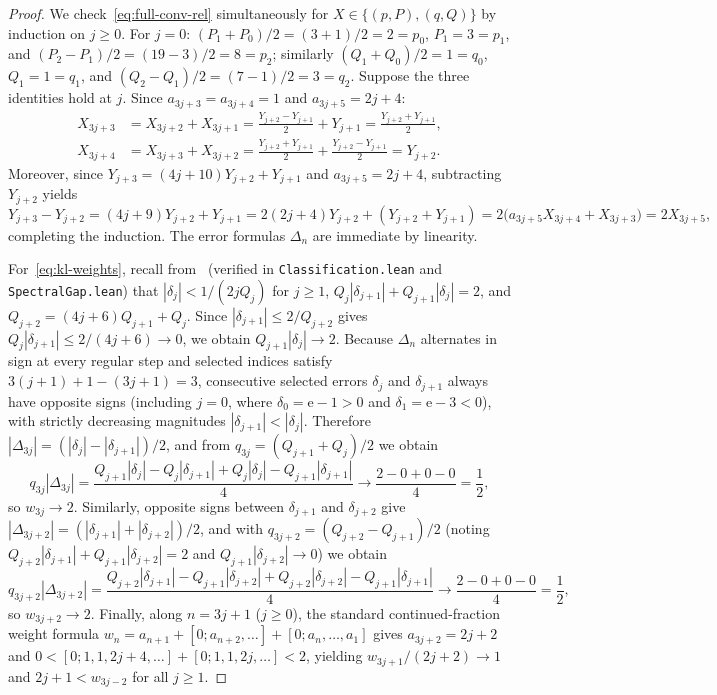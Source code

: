 \documentclass[11pt]{article}
\theoremstyle{definition}
\theoremstyle{remark}
\newcommand{\ee}{\mathrm{e}}
\begin{document}
\begin{proof}
We check~\eqref{eq:full-conv-rel} simultaneously for $X\in\{(p,P),(q,Q)\}$ by
induction on $j\ge0$. For $j=0$: $(P_1+P_0)/2=(3+1)/2=2=p_0$, $P_1=3=p_1$, and
$(P_2-P_1)/2=(19-3)/2=8=p_2$; similarly $(Q_1+Q_0)/2=1=q_0$, $Q_1=1=q_1$, and
$(Q_2-Q_1)/2=(7-1)/2=3=q_2$.
Suppose the three identities hold at $j$. Since $a_{3j+3}=a_{3j+4}=1$ and
$a_{3j+5}=2j+4$:
\begin{align*}
X_{3j+3}&=X_{3j+2}+X_{3j+1}=\frac{Y_{j+2}-Y_{j+1}}{2}+Y_{j+1}=\frac{Y_{j+2}+Y_{j+1}}{2},\\
X_{3j+4}&=X_{3j+3}+X_{3j+2}=\frac{Y_{j+2}+Y_{j+1}}{2}+\frac{Y_{j+2}-Y_{j+1}}{2}=Y_{j+2}.
\end{align*}
Moreover, since $Y_{j+3}=(4j+10)Y_{j+2}+Y_{j+1}$ and $a_{3j+5}=2j+4$, subtracting
$Y_{j+2}$ yields
\[
Y_{j+3}-Y_{j+2}=(4j+9)Y_{j+2}+Y_{j+1}=2(2j+4)Y_{j+2}+(Y_{j+2}+Y_{j+1})=2\bigl(a_{3j+5}X_{3j+4}+X_{3j+3}\bigr)=2X_{3j+5},
\]
completing the induction. The error formulas $\Delta_n$ are immediate by linearity.

For~\eqref{eq:kl-weights}, recall from~\cite{Phase1} (verified in
\texttt{Classification.lean} and \texttt{SpectralGap.lean}) that
$|\delta_j|<1/(2jQ_j)$ for $j\ge1$, $Q_j|\delta_{j+1}|+Q_{j+1}|\delta_j|=2$,
and $Q_{j+2}=(4j+6)Q_{j+1}+Q_j$. Since $|\delta_{j+1}|\le 2/Q_{j+2}$ gives
$Q_j|\delta_{j+1}|\le 2/(4j+6)\to0$, we obtain $Q_{j+1}|\delta_j|\to2$.
Because $\Delta_n$ alternates in sign at every regular step and selected
indices satisfy $3(j+1)+1-(3j+1)=3$, consecutive selected errors $\delta_j$ and
$\delta_{j+1}$ always have opposite signs (including $j=0$, where $\delta_0=\ee-1>0$
and $\delta_1=\ee-3<0$), with strictly decreasing magnitudes $|\delta_{j+1}|<|\delta_j|$.
Therefore $|\Delta_{3j}|=(|\delta_j|-|\delta_{j+1}|)/2$, and from $q_{3j}=(Q_{j+1}+Q_j)/2$
we obtain
\[
q_{3j}|\Delta_{3j}|=\frac{Q_{j+1}|\delta_j|-Q_j|\delta_{j+1}|+Q_j|\delta_j|-Q_{j+1}|\delta_{j+1}|}{4}
\longrightarrow\frac{2-0+0-0}{4}=\frac12,
\]
so $w_{3j}\to2$. Similarly, opposite signs between $\delta_{j+1}$ and $\delta_{j+2}$
give $|\Delta_{3j+2}|=(|\delta_{j+1}|+|\delta_{j+2}|)/2$, and with $q_{3j+2}=(Q_{j+2}-Q_{j+1})/2$
(noting $Q_{j+2}|\delta_{j+1}|+Q_{j+1}|\delta_{j+2}|=2$ and $Q_{j+1}|\delta_{j+2}|\to0$)
we obtain
\[
q_{3j+2}|\Delta_{3j+2}|=\frac{Q_{j+2}|\delta_{j+1}|-Q_{j+1}|\delta_{j+2}|+Q_{j+2}|\delta_{j+2}|-Q_{j+1}|\delta_{j+1}|}{4}
\longrightarrow\frac{2-0+0-0}{4}=\frac12,
\]
so $w_{3j+2}\to2$. Finally, along $n=3j+1$ ($j\ge0$), the standard continued-fraction
weight formula $w_n=a_{n+1}+[0;a_{n+2},\dots]+[0;a_n,\dots,a_1]$ gives $a_{3j+2}=2j+2$
and $0<[0;1,1,2j+4,\dots]+[0;1,1,2j,\dots]<2$, yielding $w_{3j+1}/(2j+2)\to1$
and $2j+1<w_{3j-2}$ for all $j\ge1$.
\end{proof}
\end{document}
